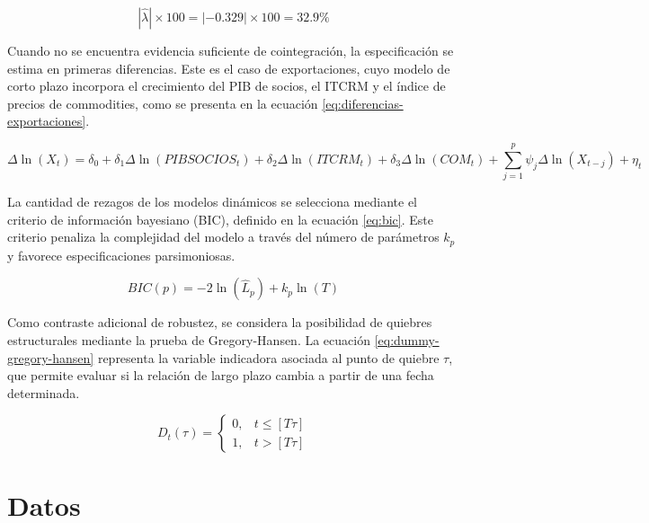 \documentclass[11pt]{article}
\begin{document}
\begin{equation}
|\widehat{\lambda}| \times 100 = |-0.329| \times 100 = 32.9\%
\label{eq:velocidad-ajuste-estimada}
\end{equation}

Cuando no se encuentra evidencia suficiente de cointegración, la especificación
se estima en primeras diferencias. Este es el caso de exportaciones, cuyo
modelo de corto plazo incorpora el crecimiento del PIB de socios, el ITCRM y el
índice de precios de commodities, como se presenta en la ecuación
\eqref{eq:diferencias-exportaciones}.

\begin{equation}
\Delta \ln(X_t)
= \delta_0
+ \delta_1 \Delta \ln(PIBSOCIOS_t)
+ \delta_2 \Delta \ln(ITCRM_t)
+ \delta_3 \Delta \ln(COM_t)
+ \sum_{j=1}^{p}\psi_j \Delta \ln(X_{t-j})
+ \eta_t
\label{eq:diferencias-exportaciones}
\end{equation}

La cantidad de rezagos de los modelos dinámicos se selecciona mediante el
criterio de información bayesiano (BIC), definido en la ecuación \eqref{eq:bic}.
Este criterio penaliza la complejidad del modelo a través del número de
parámetros \(k_p\) y favorece especificaciones parsimoniosas.

\begin{equation}
BIC(p) = -2\ln(\widehat{L}_p) + k_p \ln(T)
\label{eq:bic}
\end{equation}

Como contraste adicional de robustez, se considera la posibilidad de quiebres
estructurales mediante la prueba de Gregory-Hansen. La ecuación
\eqref{eq:dummy-gregory-hansen} representa la variable indicadora asociada al
punto de quiebre \(\tau\), que permite evaluar si la relación de largo plazo
cambia a partir de una fecha determinada.

\begin{equation}
D_t(\tau) =
\begin{cases}
0, & t \leq [T\tau] \\
1, & t > [T\tau]
\end{cases}
\label{eq:dummy-gregory-hansen}
\end{equation}



\section{Datos}
\label{sec:datos}
\end{document}
